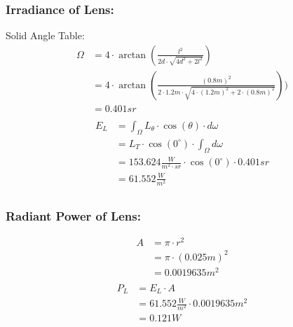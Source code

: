 \documentclass{article}
\begin{document}
    \subsubsection*{Irradiance of Lens:}
    Solid Angle Table:
    \begin{align*}
        \Omega &= 4 \cdot \arctan \left( \frac{l^2}{2d \cdot \sqrt{4d^2 + 2l^2}} \right) \\
        &= 4 \cdot \arctan \left( \frac{(0.8 m)^2}{2 \cdot 1.2 m \cdot \sqrt{4 \cdot (1.2 m)^2 + 2 \cdot (0.8 m)^2}} \right)) \\
        &= 0.401 sr \\
    \end{align*}
    \begin{align*}
        E_L &= \int_{\Omega} L_{\theta} \cdot \cos(\theta) \cdot d\omega \\
        &= L_T \cdot \cos(0^{\circ}) \cdot \int_{\Omega} d\omega \\
        &= 153.624 \frac{W}{m^2 \cdot sr} \cdot \cos(0^\circ) \cdot 0.401 sr \\
        &= 61.552 \frac{W}{m^2} \\
    \end{align*}
    \subsubsection*{Radiant Power of Lens:}
    \begin{align*}
        A &= \pi \cdot r^2 \\
        &= \pi \cdot (0.025 m)^2 \\
        &= 0.0019635 m^2 \\
    \end{align*}
    \begin{align*}
        P_L &= E_L \cdot A \\
        &= 61.552 \frac{W}{m^2} \cdot 0.0019635 m^2 \\
        &= 0.121 W \\
    \end{align*}
\end{document}
